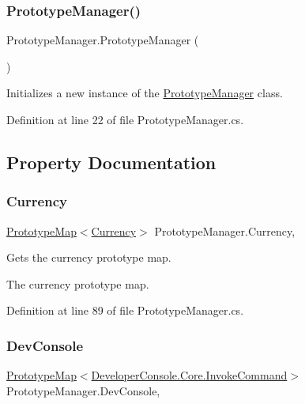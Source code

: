 \subsubsection{\texorpdfstring{Prototype\+Manager()}{PrototypeManager()}}
{\footnotesize\ttfamily Prototype\+Manager.\+Prototype\+Manager (\begin{DoxyParamCaption}{ }\end{DoxyParamCaption})}



Initializes a new instance of the \hyperlink{class_prototype_manager}{Prototype\+Manager} class. 



Definition at line 22 of file Prototype\+Manager.\+cs.



\subsection{Property Documentation}
\mbox{\label{class_prototype_manager_abb50bcd27c70b54bbbc1a7f41240a9c4}} 
\subsubsection{\texorpdfstring{Currency}{Currency}}
{\footnotesize\ttfamily \hyperlink{class_prototype_map}{Prototype\+Map}$<$\hyperlink{class_currency}{Currency}$>$ Prototype\+Manager.\+Currency\hspace{0.3cm}{\ttfamily [static]}, {\ttfamily [get]}}



Gets the currency prototype map. 

The currency prototype map.

Definition at line 89 of file Prototype\+Manager.\+cs.

\mbox{\label{class_prototype_manager_a977c115543de50e74e63ab5e581212f1}} 
\subsubsection{\texorpdfstring{Dev\+Console}{DevConsole}}
{\footnotesize\ttfamily \hyperlink{class_prototype_map}{Prototype\+Map}$<$\hyperlink{class_developer_console_1_1_core_1_1_invoke_command}{Developer\+Console.\+Core.\+Invoke\+Command}$>$ Prototype\+Manager.\+Dev\+Console\hspace{0.3cm}{\ttfamily [static]}, {\ttfamily [get]}}



